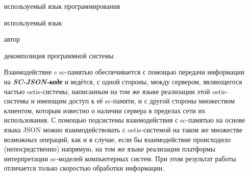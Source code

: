 \begin{SCn}
\begin{scnrelfromlist}{используемый язык программирования}
\end{scnrelfromlist}
\begin{scnrelfromlist}{используемый язык}
\end{scnrelfromlist}
\begin{scnrelfromlist}{автор}
\end{scnrelfromlist}
\begin{scnrelfromset}{декомпозиция программной системы}
    \scnnonamednode
    \begin{scneqtoset}
    \end{scneqtoset}
\end{scnrelfromset}
\end{SCn}

Взаимодействие c sc-памятью обеспечивается с помощью передачи информации на \textit{\textbf{SC-JSON-коде}} и ведётся,
с одной стороны, между сервером, являющегося частью ostis-системы, написанным на том же языке реализации этой ostis-
системы и имеющим доступ к её sc-памяти, и с другой стороны множеством клиентом, которым известно о наличии сервера
в пределах сети их использования. С помощью подсистемы взаимодействия с sc-памятью на основе языка JSON можно
взаимодействовать с ostis-системой на таком же множестве возможных операций, как и в случае, если бы взаимодействие
происходило (непосредственно) напрямую, на том же языке реализации платформы интерпретации sc-моделей компьютерных
систем. При этом результат работы отличается только скоростью обработки информации.

